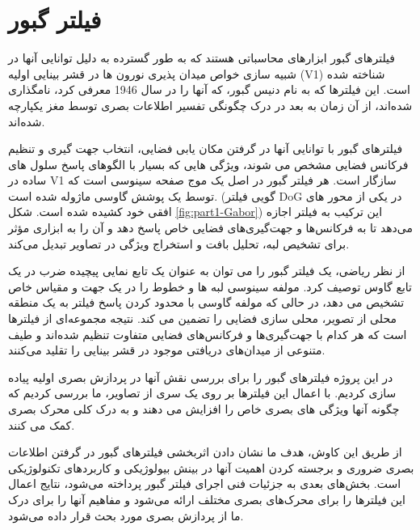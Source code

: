     \clearpage
    \section{فیلتر گبور}
        فیلترهای گبور ابزارهای محاسباتی هستند که به طور گسترده به دلیل توانایی آنها در شبیه سازی خواص میدان پذیری نورون ها در قشر بینایی اولیه 
        (V1) 
        شناخته شده است. این فیلترها که به نام دنیس گبور، که آنها را در سال 1946 معرفی کرد، نامگذاری شده‌اند، از آن زمان به بعد در درک چگونگی تفسیر اطلاعات بصری توسط مغز یکپارچه شده‌اند.

        فیلترهای گبور با توانایی آنها در گرفتن مکان یابی فضایی، انتخاب جهت گیری و تنظیم فرکانس فضایی مشخص می شوند، ویژگی هایی که بسیار با الگوهای پاسخ سلول های ساده در 
        V1 
        سازگار است. هر فیلتر گبور در اصل یک موج صفحه سینوسی است که توسط یک پوشش گاوسی ماژوله شده است.
        (گویی فیلتر 
        DoG 
        در یکی از محور های افقی خود کشیده شده است.
        شکل \ref{fig:part1-Gabor})
        این ترکیب به فیلتر اجازه می‌دهد تا به فرکانس‌ها و جهت‌گیری‌های فضایی خاص پاسخ دهد و آن را به ابزاری مؤثر برای تشخیص لبه، تحلیل بافت و استخراج ویژگی در تصاویر تبدیل می‌کند.
        
        از نظر ریاضی، یک فیلتر گبور را می توان به عنوان یک تابع نمایی پیچیده ضرب در یک تابع گاوس توصیف کرد. مولفه سینوسی لبه ها و خطوط را در یک جهت و مقیاس خاص تشخیص می دهد، در حالی که مولفه گاوسی با محدود کردن پاسخ فیلتر به یک منطقه محلی از تصویر، محلی سازی فضایی را تضمین می کند. نتیجه مجموعه‌ای از فیلترها است که هر کدام با جهت‌گیری‌ها و فرکانس‌های فضایی متفاوت تنظیم شده‌اند و طیف متنوعی از میدان‌های دریافتی موجود در قشر بینایی را تقلید می‌کنند.
        
        در این پروژه فیلترهای گبور را برای بررسی نقش آنها در پردازش بصری اولیه پیاده سازی کردیم. با اعمال این فیلترها بر روی یک سری از تصاویر، ما بررسی کردیم که چگونه آنها ویژگی های بصری خاص را افزایش می دهند و به درک کلی محرک بصری کمک می کنند.
        
        از طریق این کاوش، هدف ما نشان دادن اثربخشی فیلترهای گبور در گرفتن اطلاعات بصری ضروری و برجسته کردن اهمیت آنها در بینش بیولوژیکی و کاربردهای تکنولوژیکی است. بخش‌های بعدی به جزئیات فنی اجرای فیلتر گبور پرداخته می‌شود، نتایج اعمال این فیلترها را برای محرک‌های بصری مختلف ارائه می‌شود و مفاهیم آنها را برای درک ما از پردازش بصری مورد بحث قرار داده می‌شود.

